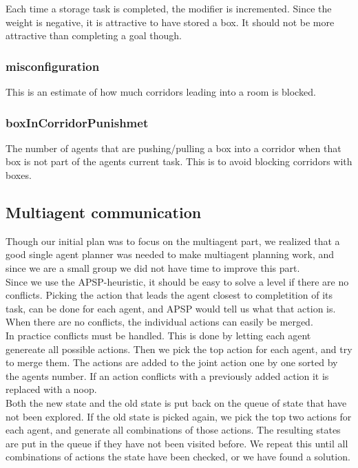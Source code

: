\documentclass[letterpaper]{article}
\begin{document}
Each time a storage task is completed, the modifier is incremented. Since the weight is
negative, it is attractive to have stored a box. It should not be more attractive than
completing a goal though.

\subsubsection{misconfiguration}
This is an estimate of how much corridors leading into a room is blocked.

\subsubsection{boxInCorridorPunishmet}
The number of agents that are pushing/pulling a box into a corridor when that box
is not part of the agents current task. This is to avoid blocking corridors with boxes.

\subsection{Multiagent communication}
Though our initial plan was to focus on the multiagent part, we realized that
a good single agent planner was needed to make multiagent planning work,
and since we are a small group we did not have time to improve this part.\\

Since we use the APSP-heuristic, it should be easy to solve a level if
there are no conflicts. Picking the action that leads
the agent closest to completition of its task, can be done for each agent,
and APSP would tell us what that action is. When there are no conflicts,
the individual actions can easily be merged.\\

In practice conflicts must be handled. This is done by letting each agent
genereate all possible actions. Then we pick the top action for each agent,
and try to merge them. The actions are added to the joint action one by one
sorted by the agents number. If an action conflicts with a previously added
action it is replaced with a noop.\\

Both the new state and the old state is put back on the queue of state that have
not been explored. If the old state is picked again, we pick the top two actions
for each agent, and generate all combinations of those actions. The resulting states
are put in the queue if they have not been visited before. We repeat this until
all combinations of actions the state have been checked, or we have found a solution.\\
\end{document}

